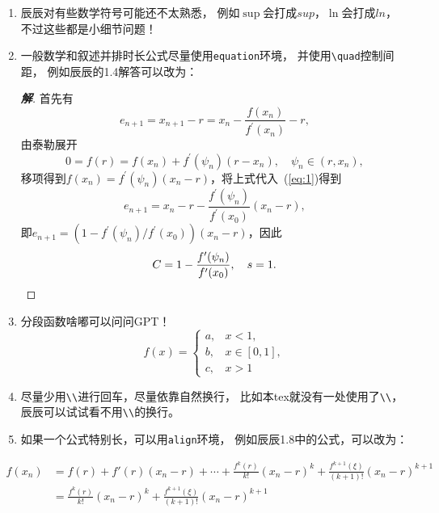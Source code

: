 \documentclass[lang=cn,bibend=bibtex]{elegantpaper}
\theoremstyle{boldexercise}
\newenvironment{solution}{\begin{proof}[\textbf{\emph 解}]}{\end{proof}}
\begin{document}
\begin{enumerate}
\item 
  辰辰对有些数学符号可能还不太熟悉，
  例如$\sup$会打成$sup$，$\ln$会打成$ln$，
  不过这些都是小细节问题！
\item 一般数学和叙述并排时长公式尽量使用\lstinline|equation|环境，
  并使用\lstinline|\quad|控制间距，
  例如辰辰的1.4解答可以改为：
  \begin{solution}
    首先有
    \begin{equation}
      \label{eq:1}
      e_{n+1} = x_{n+1} - r = x_n - \frac{f(x_n)}{f^{\prime}(x_n)} - r,
    \end{equation}
    由泰勒展开
    \begin{equation}
      0 = f(r) = f(x_n) + f^{\prime}(\psi_n)(r-x_n),\quad \psi_n \in (r,x_n),
    \end{equation}
    移项得到$f(x_n) = f^{\prime}(\psi_n)(x_n - r)$，将上式代入~(\ref{eq:1})得到
    \begin{equation}
      e_{n+1} = x_n - r - \frac{f^{\prime}(\psi_n)}{f^{\prime}(x_0)}(x_n - r),
    \end{equation}
    即$e_{n+1} = (1 - f^{\prime}(\psi_n)/f^{\prime}(x_0))(x_n - r)$，因此
    \begin{equation}
      C = 1 - \frac{f^{\prime}(\psi_n)}{f^{\prime}(x_0)}, \quad s = 1.\qedhere
    \end{equation}
  \end{solution}
\item 分段函数啥嘟可以问问GPT！
  \begin{equation}
    f(x) =
    \begin{cases}
      a, & x < 1,\\
      b, & x \in [0,1],\\
      c, & x > 1
    \end{cases}
  \end{equation}
\item 尽量少用\lstinline|\\|进行回车，尽量依靠自然换行，
  比如本tex就没有一处使用了\lstinline|\\|，
  辰辰可以试试看不用\lstinline|\\|的换行。
\item 如果一个公式特别长，可以用\lstinline|align|环境，
  例如辰辰1.8中的公式，可以改为：
\end{enumerate}

\begin{align}
  f(x_n)&=f(r)+f'(r)(x_n-r)+\cdots+\frac{f^k(r)}{k!}(x_n-r)^k+\frac{f^{k+1}(\xi)}{(k+1)!}(x_n-r)^{k+1}\\
        &=\frac{f^k(r)}{k!}(x_n-r)^k+\frac{f^{k+1}(\xi)}{(k+1)!}(x_n-r)^{k+1}
\end{align}
\end{document}
